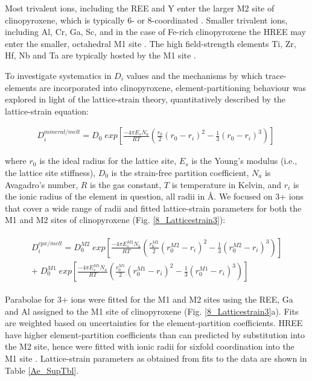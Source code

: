 \documentclass[review,authoryear,12pt]{elsarticle}
\begin{document}
Most trivalent ions, including the REE and Y enter the larger M2 site of clinopyroxene, which is typically 6- or 8-coordinated \citep{Deer1992}. Smaller trivalent ions, including Al, Cr, Ga, Sc, and in the case of Fe-rich clinopyroxene the HREE may enter the smaller, octahedral M1 site \citep{Olin2010, Bedard2014}. The high field-strength elements Ti, Zr, Hf, Nb and Ta are typically hosted by the M1 site \citep{Hill2000, Hill2011, Dygert2014}.

To investigate systematics in $D_i$ values and the mechanisms by which trace-elements are incorporated into clinopyroxene, element-partitioning behaviour was explored in light of the lattice-strain theory, quantitatively described by the lattice-strain equation: 

	\begin{align} %
	   D_i^{mineral/melt} = D_0 \; exp \left[\frac{-4\pi E_sN_a}{RT} \left(\frac{r_0}{2}(r_0-r_i)^2-\frac{1}{3}(r_0-r_i)^3\right)\right]\
	   \label{LST_eqn}
	\end{align}
	
where $r_0$ is the ideal radius for the lattice site, $E_s$ is the Young's modulus (i.e., the lattice site stiffness), $D_0$ is the strain-free partition coefficient, $N_a$ is Avagadro's number, $R$ is the gas constant, $T$ is temperature in Kelvin, and $r_i$ is the ionic radius of the element in question, all radii in \si{\angstrom}. We focused on 3+ ions that cover a wide range of radii and fitted lattice-strain parameters for both the M1 and M2 sites of clinopyroxene (Fig. \ref{8_Latticestrain3}):
		
	\begin{align} %
	\begin{split}
	   D_i^{cpx/melt} = D_0^{M2} \; exp \left[\frac{-4\pi E_s^{M2} N_a}{RT} \left(\frac{r_0^{M2}}{2}(r_0^{M2}-r_i)^2-\frac{1}{3}(r_0^{M2}-r_i)^3\right)\right] \\
  + \; D_0^{M1} \; exp \left[\frac{-4\pi E_s^{M1} N_a}{RT} \left(\frac{r_0^{M1}}{2}(r_0^{M1}-r_i)^2-\frac{1}{3}(r_0^{M1}-r_i)^3\right)\right]\
	\end{split}
	\label{LST_eqn_cpx}
	\end{align}
	
	Parabolae for 3+ ions were fitted for the M1 and M2 sites using the REE, Ga and Al assigned to the M1 site of clinopyroxene (Fig. \ref{8_Latticestrain3}a). Fits are weighted based on uncertainties for the element-partition coefficients. HREE have higher element-partition coefficients than can predicted by substitution into the M2 site, hence were fitted with ionic radii for sixfold coordination into the M1 site \citep[\textit{cf.}][]{Olin2010, Reguir2012}.
	Lattice-strain parameters as obtained from fits to the data are shown in Table \ref{Ae_SupTbl}.
	
\end{document}

